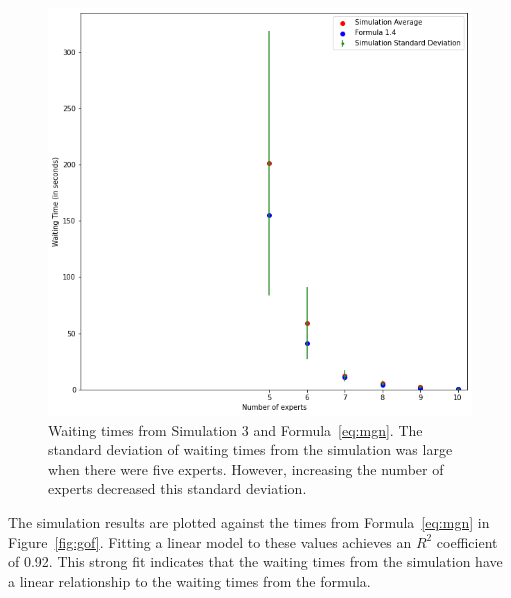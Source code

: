 \begin{figure}[H]
  \includegraphics[width=\textwidth]{figures/montecarlo/full_expected_sim.png}
  \caption{
    Waiting times from Simulation 3 and Formula~\ref{eq:mgn}.
    The standard deviation of waiting times from the simulation was large when
    there were five experts.
    However, increasing the number of experts decreased this standard deviation.
  }\label{fig:full_expected_sim}
\end{figure}

The simulation results are plotted against the times from Formula~\ref{eq:mgn}
in Figure~\ref{fig:gof}.
Fitting a linear model to these values achieves an $R^2$ coefficient of 0.92.
This strong fit indicates that the waiting times from the simulation have a
linear relationship to the waiting times from the formula.

